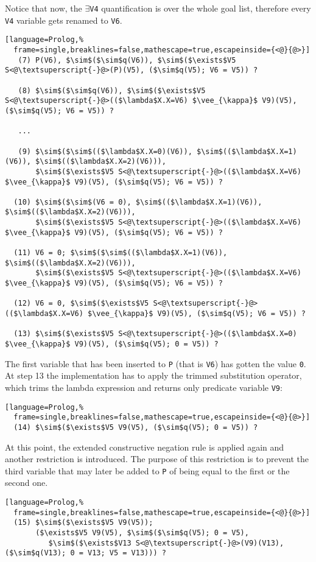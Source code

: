 \documentclass[inscr,ack,preface]{dithesis}
\theoremstyle{definition}
\begin{document}
Notice that now, the \texttt{$\exists$V4} quantification is over the whole goal list, therefore every \texttt{V4} variable gets renamed to \texttt{V6}.
\begin{lstlisting}[language=Prolog,%
  frame=single,breaklines=false,mathescape=true,escapeinside={<@}{@>}]
   (7) P(V6), $\sim$($\sim$q(V6)), $\sim$($\exists$V5 S<@\textsuperscript{-}@>(P)(V5), ($\sim$q(V5); V6 = V5)) ?

   (8) $\sim$($\sim$q(V6)), $\sim$($\exists$V5 S<@\textsuperscript{-}@>(($\lambda$X.X=V6) $\vee_{\kappa}$ V9)(V5), ($\sim$q(V5); V6 = V5)) ?

   ...

   (9) $\sim$($\sim$(($\lambda$X.X=0)(V6)), $\sim$(($\lambda$X.X=1)(V6)), $\sim$(($\lambda$X.X=2)(V6))),
       $\sim$($\exists$V5 S<@\textsuperscript{-}@>(($\lambda$X.X=V6) $\vee_{\kappa}$ V9)(V5), ($\sim$q(V5); V6 = V5)) ?

  (10) $\sim$($\sim$(V6 = 0), $\sim$(($\lambda$X.X=1)(V6)), $\sim$(($\lambda$X.X=2)(V6))),
       $\sim$($\exists$V5 S<@\textsuperscript{-}@>(($\lambda$X.X=V6) $\vee_{\kappa}$ V9)(V5), ($\sim$q(V5); V6 = V5)) ?

  (11) V6 = 0; $\sim$($\sim$(($\lambda$X.X=1)(V6)), $\sim$(($\lambda$X.X=2)(V6))),
       $\sim$($\exists$V5 S<@\textsuperscript{-}@>(($\lambda$X.X=V6) $\vee_{\kappa}$ V9)(V5), ($\sim$q(V5); V6 = V5)) ?

  (12) V6 = 0, $\sim$($\exists$V5 S<@\textsuperscript{-}@>(($\lambda$X.X=V6) $\vee_{\kappa}$ V9)(V5), ($\sim$q(V5); V6 = V5)) ?

  (13) $\sim$($\exists$V5 S<@\textsuperscript{-}@>(($\lambda$X.X=0) $\vee_{\kappa}$ V9)(V5), ($\sim$q(V5); 0 = V5)) ?
\end{lstlisting}

The first variable that has been inserted to \texttt{P} (that is \texttt{V6}) has gotten the value \texttt{0}. At step 13 the implementation has to apply the trimmed substitution operator, which trims the lambda expression and returns only predicate variable \texttt{V9}:
\begin{lstlisting}[language=Prolog,%
  frame=single,breaklines=false,mathescape=true,escapeinside={<@}{@>}]
  (14) $\sim$($\exists$V5 V9(V5), ($\sim$q(V5); 0 = V5)) ?
\end{lstlisting}

At this point, the extended constructive negation rule is applied again and another restriction is introduced. The purpose of this restriction is to prevent the third variable that may later be added to \texttt{P} of being equal to the first or the second one.
\begin{lstlisting}[language=Prolog,%
  frame=single,breaklines=false,mathescape=true,escapeinside={<@}{@>}]
  (15) $\sim$($\exists$V5 V9(V5));
       ($\exists$V5 V9(V5), $\sim$($\sim$q(V5); 0 = V5),
          $\sim$($\exists$V13 S<@\textsuperscript{-}@>(V9)(V13), ($\sim$q(V13); 0 = V13; V5 = V13))) ?
\end{lstlisting}
\end{document}
